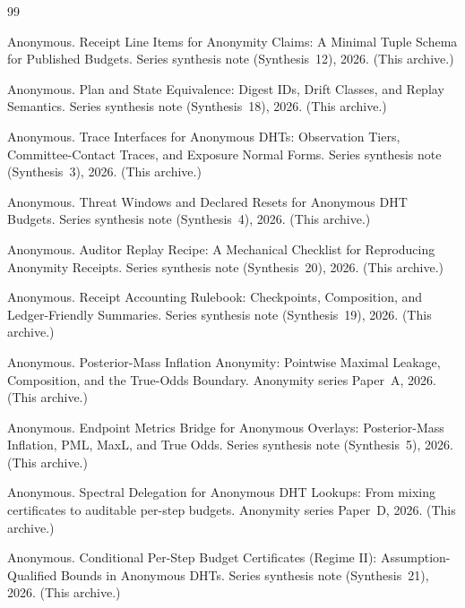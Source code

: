 \documentclass[11pt]{article}
\begin{document}
\begin{thebibliography}{99}\small

Anonymous.
\newblock Receipt Line Items for Anonymity Claims: A Minimal Tuple Schema for Published Budgets.
\newblock Series synthesis note (Synthesis~12), 2026. (This archive.)

Anonymous.
\newblock Plan and State Equivalence: Digest IDs, Drift Classes, and Replay Semantics.
\newblock Series synthesis note (Synthesis~18), 2026. (This archive.)

Anonymous.
\newblock Trace Interfaces for Anonymous DHTs: Observation Tiers, Committee-Contact Traces, and Exposure Normal Forms.
\newblock Series synthesis note (Synthesis~3), 2026. (This archive.)

Anonymous.
\newblock Threat Windows and Declared Resets for Anonymous DHT Budgets.
\newblock Series synthesis note (Synthesis~4), 2026. (This archive.)

Anonymous.
\newblock Auditor Replay Recipe: A Mechanical Checklist for Reproducing Anonymity Receipts.
\newblock Series synthesis note (Synthesis~20), 2026. (This archive.)

Anonymous.
\newblock Receipt Accounting Rulebook: Checkpoints, Composition, and Ledger-Friendly Summaries.
\newblock Series synthesis note (Synthesis~19), 2026. (This archive.)

Anonymous.
\newblock Posterior-Mass Inflation Anonymity: Pointwise Maximal Leakage, Composition, and the True-Odds Boundary.
\newblock Anonymity series Paper~A, 2026. (This archive.)

Anonymous.
\newblock Endpoint Metrics Bridge for Anonymous Overlays: Posterior-Mass Inflation, PML, MaxL, and True Odds.
\newblock Series synthesis note (Synthesis~5), 2026. (This archive.)

Anonymous.
\newblock Spectral Delegation for Anonymous DHT Lookups: From mixing certificates to auditable per-step budgets.
\newblock Anonymity series Paper~D, 2026. (This archive.)

Anonymous.
\newblock Conditional Per-Step Budget Certificates (Regime II): Assumption-Qualified Bounds in Anonymous DHTs.
\newblock Series synthesis note (Synthesis~21), 2026. (This archive.)


\end{thebibliography}
\end{document}
